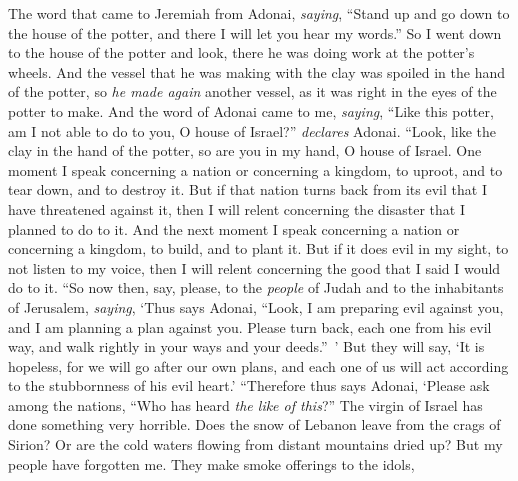 \begin{biblechapter} %
 The word that came to Jeremiah from Adonai, \textit{saying},
\verse “Stand up and go down to the house of the potter, and there I will let you hear my words.”
\verse So I went down to the house of the potter and look, there he was doing work at the potter’s wheels.
\verse And the vessel that he was making with the clay was spoiled in the hand of the potter, so \textit{he made again} another vessel, as it was right in the eyes of the potter to make.
\verse And the word of Adonai came to me, \textit{saying},
\verse “Like this potter, am I not able to do to you, O house of Israel?” \textit{declares} Adonai. “Look, like the clay in the hand of the potter, so are you in my hand, O house of Israel.
\verse One moment I speak concerning a nation or concerning a kingdom, to uproot, and to tear down, and to destroy it.
\verse But if that nation turns back from its evil that I have threatened against it, then I will relent concerning the disaster that I planned to do to it.
\verse And the next moment I speak concerning a nation or concerning a kingdom, to build, and to plant it.
\verse But if it does evil in my sight, to not listen to my voice, then I will relent concerning the good that I said I would do to it.
\verse “So now then, say, please, to the \textit{people} of Judah and to the inhabitants of Jerusalem, \textit{saying}, ‘Thus says Adonai, “Look, I am preparing evil against you, and I am planning a plan against you. Please turn back, each one from his evil way, and walk rightly in your ways and your deeds.” ’
\verse But they will say, ‘It is hopeless, for we will go after our own plans, and each one of us will act according to the stubbornness of his evil heart.’
\verse “Therefore thus says Adonai,
\verse ‘Please ask among the nations, “Who has heard \textit{the like of this}?” 
The virgin of Israel has done something very horrible.
\verse Does the snow of Lebanon leave from the crags of Sirion? 
Or are the cold waters flowing from distant mountains dried up?
\verse But my people have forgotten me. 
They make smoke offerings to the idols, 

\end{biblechapter}
